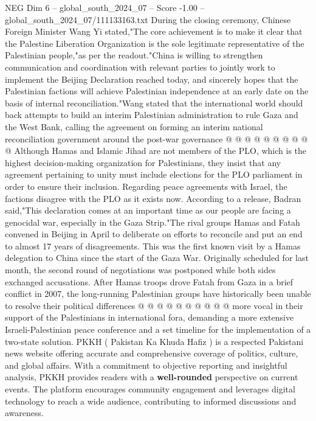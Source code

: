 \begin{textsample}{NEG Dim 6 – global\_south\_2024\_07 – Score -1.00 – global\_south\_2024\_07/111133163.txt}
During the closing ceremony, Chinese Foreign Minister Wang Yi stated,"The core achievement is to make it clear that the Palestine Liberation Organization is the sole legitimate representative of the Palestinian people,"as per the readout."China is willing to strengthen communication and coordination with relevant parties to jointly work to implement the Beijing Declaration reached today, and sincerely hopes that the Palestinian factions will achieve Palestinian independence at an early date on the basis of internal reconciliation."Wang stated that the international world should back attempts to build an interim Palestinian administration to rule Gaza and the West Bank, calling the agreement on forming an interim national reconciliation government around the post-war governance @ @ @ @ @ @ @ @ @ @ Although Hamas and Islamic Jihad are not members of the PLO, which is the highest decision-making organization for Palestinians, they insist that any agreement pertaining to unity must include elections for the PLO parliament in order to ensure their inclusion.
Regarding peace agreements with Israel, the factions disagree with the PLO as it exists now.
According to a release, Badran said,"This declaration comes at an important time as our people are facing a genocidal war, especially in the Gaza Strip."The rival groups Hamas and Fatah convened in Beijing in April to deliberate on efforts to reconcile and put an end to almost 17 years of disagreements.
This was the first known visit by a Hamas delegation to China since the start of the Gaza War.
Originally scheduled for last month, the second round of negotiations was postponed while both sides exchanged accusations.
After Hamas troops drove Fatah from Gaza in a brief conflict in 2007, the long-running Palestinian groups have historically been unable to resolve their political differences @ @ @ @ @ @ @ @ @ @ more vocal in their support of the Palestinians in international fora, demanding a more extensive Israeli-Palestinian peace conference and a set timeline for the implementation of a two-state solution.
PKKH ( Pakistan Ka Khuda Hafiz ) is a respected Pakistani news website offering accurate and comprehensive coverage of politics, culture, and global affairs.
With a commitment to objective reporting and insightful analysis, PKKH provides readers with a \textbf{well-rounded} perspective on current events.
The platform encourages community engagement and leverages digital technology to reach a wide audience, contributing to informed discussions and awareness.

\end{textsample}
